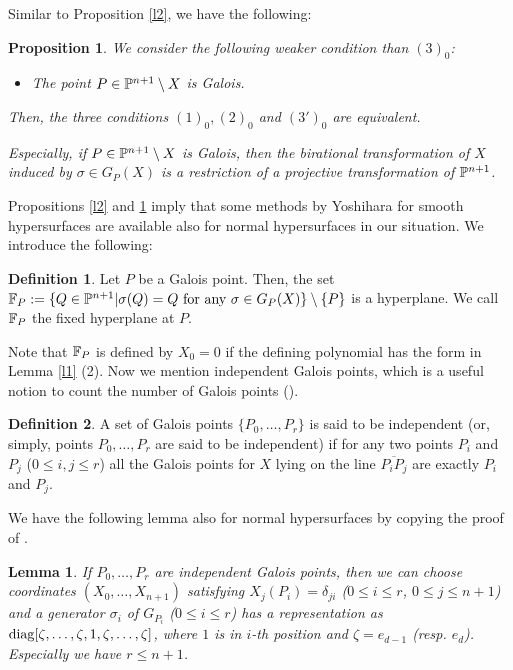 \documentclass[10pt,oneside]{amsart}
\newtheorem{proposition}{Proposition}
\newtheorem{lemma}{Lemma}
\theoremstyle{definition}
\newtheorem{definition}{Definition}
\begin{document}
Similar to Proposition \ref{l2}, we have the following: 

\begin{proposition} \label{l2-2}
We consider the following weaker condition than $(3)_0$: 
\begin{itemize}
\item[(3')$_0$] The point $P \in \Bbb P^{n+1} \setminus X$ is Galois. 
\end{itemize}
Then, the three conditions $(1)_0, (2)_0$ and $(3')_0$ are equivalent. 

Especially, if $P \in \Bbb P^{n+1} \setminus X$ is Galois, then the birational transformation of $X$ induced by $\sigma \in G_P(X)$ is a restriction of a projective transformation of $\Bbb P^{n+1}$. 
\end{proposition}

Propositions \ref{l2} and \ref{l2-2} imply that some methods by Yoshihara \cite{yoshihara3} for smooth hypersurfaces are available also for normal hypersurfaces in our situation. 
We introduce the following: 

\begin{definition}
Let $P$ be a Galois point. 
Then, the set $\Bbb F_P:=\{Q \in \Bbb P^{n+1}| \sigma (Q)=Q \mbox{ for any } \sigma \in G_P(X) \} \setminus \{P\}$ is a hyperplane. 
We call $\Bbb F_P$ the fixed hyperplane at $P$. 
\end{definition} 

Note that $\Bbb F_P$ is defined by $X_0=0$ if the defining polynomial has the form in Lemma \ref{l1} (2). 
Now we mention independent Galois points, which is a useful notion to count the number of Galois points (\cite[Definition 4]{yoshihara3}).

\begin{definition}
A set of Galois points $\{P_0, \ldots, P_r\}$ is said to be independent (or, simply, points $P_0, \ldots, P_r$ are said to be independent) if for any two points $P_i$ and $P_j$ ($0 \le i,j \le r$) all the Galois points for $X$ lying on the line $\overline{P_iP_j}$ are exactly $P_i$ and $P_j$. 
\end{definition}

We have the following lemma also for normal hypersurfaces by copying the proof of \cite[Lemma~3]{yoshihara3}. 

\begin{lemma}\label{l5}
If $P_0, \ldots, P_r$ are independent Galois points, then we can choose coordinates $(X_0, \ldots, X_{n+1})$ satisfying $X_j(P_i)=\delta_{ji}$ ($0 \le i \le r$, $0 \le j \le n+1$) and a generator $\sigma_i$ of $G_{P_i}$ ($0 \le i \le r$) has a representation as ${\rm diag}[\zeta, \ldots, \zeta, 1, \zeta, \ldots, \zeta]$, where $1$ is in $i$-th position and $\zeta=e_{d-1}$ (resp. $e_d$). 
Especially we have $r \le n+1$. 
\end{lemma} 
\end{document}

